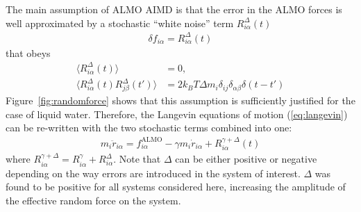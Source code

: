 \documentclass[aps,prl,reprint,amsmath,amssymb]{revtex4-1}
\begin{document}


The main assumption of ALMO AIMD is that the error in the ALMO forces is well approximated by a stochastic ``white noise'' term $R^{\Delta}_{i\alpha} (t)$
%
\begin{align}
\label{eq:assumption}
\delta f_{i\alpha} = R^{\Delta}_{i\alpha} (t)
\end{align}
%
that obeys
%
\begin{align}
\label{eq:stochastic2}
\langle R^{\Delta}_{i\alpha} (t) \rangle &= 0, \\
\label{eq:stochastic3}
\langle R^{\Delta}_{i\alpha} (t)  R^{\Delta}_{j\beta} (t') \rangle &= 2 k_B T \Delta m_i \delta_{ij} \delta_{\alpha\beta} \delta(t-t')
\end{align}
%
Figure~\ref{fig:randomforce} shows that this assumption is sufficiently justified for the case of liquid water. 
Therefore, the Langevin equations of motion (\ref{eq:langevin}) can be re-written with the two stochastic terms combined into one:
%
\begin{align}
\label{eq:langevin2}
m_i \ddot{r}_{i\alpha} = f^{\text{ALMO}}_{i\alpha} - \gamma m_i \dot{r}_{i\alpha} + R^{\gamma + \Delta}_{i\alpha} (t)
\end{align}
%
where $R^{\gamma + \Delta}_{i\alpha} = R^{\gamma}_{i\alpha} + R^{\Delta}_{i\alpha}$. 
Note that $\Delta$ can be either positive or negative depending on the way errors are introduced in the system of interest. 
$\Delta$ was found to be positive for all systems considered here, increasing the amplitude of the effective random force on the system.
\end{document}
